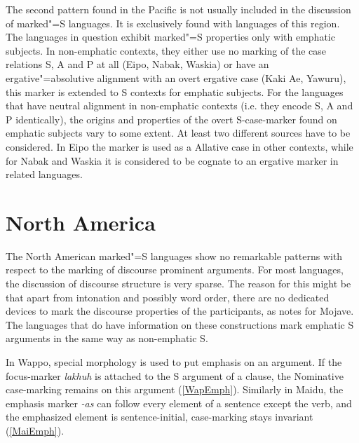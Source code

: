 The second pattern found in the Pacific is not usually included in the discussion of marked"=S languages. 
It is exclusively found with languages of this region.
The languages in question exhibit marked"=S properties only with emphatic subjects. 
In non-emphatic contexts, they either use no marking of the case relations S, A and P at all (Eipo, Nabak, Waskia) or have an ergative"=absolutive alignment with an overt ergative case (Kaki Ae, Yawuru), this marker is extended to S contexts for emphatic subjects. 
For the languages that have neutral alignment in non-emphatic contexts (i.e. they encode S, A and P identically), the origins and properties of the overt S-case-marker found on emphatic subjects vary to some extent. 
At least two different sources have to be considered. 
In Eipo the marker is used as a Allative case in other contexts, while for Nabak and Waskia it is considered to be cognate to an ergative marker in related languages.  



\section{North America}\label{EmphNA}

The North American marked"=S languages show no remarkable patterns with respect to the marking of discourse prominent arguments.
For most languages, the discussion of discourse structure is very sparse. 
The reason for this might be that apart from intonation and possibly word order, there are no dedicated devices to mark the discourse properties of the participants, as \citet[276]{Munro:1976} notes for Mojave. 
The languages that do have information on these constructions mark emphatic S arguments in the same way as non-emphatic S.

In Wappo, special morphology is used to put emphasis on an argument. 
If the focus-marker \emph{lakhuh} is attached to the S argument of a clause, the Nominative  case-marking remains on this argument (\ref{WapEmph}).
Similarly in Maidu, the emphasis marker \emph{-{\textglotstop}as} can follow every element of a sentence except the verb, and the emphasized element is sentence-initial, case-marking stays invariant (\ref{MaiEmph}).  

